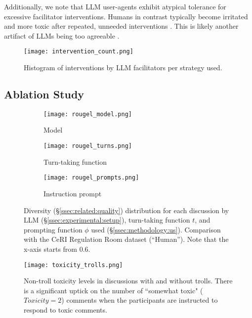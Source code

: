 Additionally, we note that LLM user-agents exhibit atypical tolerance for excessive facilitator interventions. Humans in contrast typically become irritated and more toxic after repeated, unneeded interventions \citep{schaffner_community_guidelines, make_reddit_great, proactive_moderation, cresci_pesonalized_interventions}. This is likely another artifact of LLMs being too agreeable \citep{park2023game, anthis_2025}.

\begin{figure}[t]
	\centering
	\texttt{[image: intervention\_count.png]}
	\caption{Histogram of interventions by LLM facilitators per strategy used.}
	\label{fig:intervention_count}
\end{figure}


\subsection{Ablation Study}
\label{ssec:results:ablation}

\begin{figure*}[t]
    \begin{subfigure}{0.32\linewidth}
        \texttt{[image: rougel\_model.png]}
        \caption{Model}
        \label{fig:rougel_model}
    \end{subfigure}%
    \hfill
    \begin{subfigure}{0.32\linewidth}
        \texttt{[image: rougel\_turns.png]}
        \caption{Turn-taking function}
        \label{fig:rougel_turns}
    \end{subfigure}%
    \hfill
    \begin{subfigure}{0.32\linewidth}
        \texttt{[image: rougel\_prompts.png]}
        \caption{Instruction prompt}
        \label{fig:rougel_prompts}
    \end{subfigure}%

    \caption{Diversity (\S\ref{ssec:related:quality}) distribution for each discussion by LLM (\S\ref{ssec:experimental:setup}), turn-taking function $t$, and prompting function $\phi$ used (\S\ref{ssec:methodology:us}). Comparison with the CeRI Regulation Room dataset (``Human''). Note that the x-axis starts from $0.6$.}
    \label{fig:diversity}
\end{figure*}

\begin{figure}[t]
	\centering
	\texttt{[image: toxicity\_trolls.png]}
	\caption{Non-troll toxicity levels in discussions with and without trolls. There is a significant uptick on the number of ``somewhat toxic" ($Toxicity=2$) comments when the participants are instructed to respond to toxic comments.}
	\label{fig:toxicity_trolls}
\end{figure}

